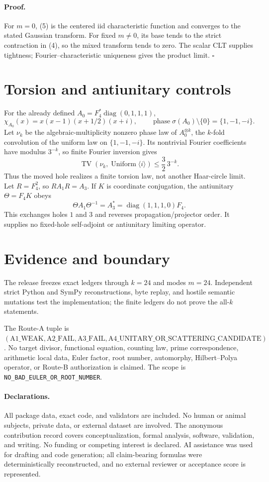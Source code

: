 \documentclass[10pt]{article}
\begin{document}
\paragraph{Proof.}
For $m=0$, (5) is the centered iid characteristic function and converges to
the stated Gaussian transform.  For fixed $m\ne0$, its base tends to the
strict contraction in (4), so the mixed transform tends to zero.  The scalar
CLT supplies tightness; Fourier--characteristic uniqueness gives the product
limit. \hfill$\square$

\section{Torsion and antiunitary controls}
For the already defined $A_0=F_4^*\operatorname{diag}(0,1,1,1)$,
\[
 \chi_{A_0}(x)=x(x-1)(x+1/2)(x+i),\qquad
 \operatorname{phase}\sigma(A_0)\setminus\{0\}=\{1,-1,-i\}.  \tag{6}
\]
Let $\nu_k$ be the algebraic-multiplicity nonzero phase law of
$A_0^{\otimes k}$, the $k$-fold convolution of the uniform law on
$\{1,-1,-i\}$.  Its nontrivial Fourier coefficients have modulus $3^{-k}$,
so finite Fourier inversion gives
\[
 \operatorname{TV}(\nu_k,\operatorname{Uniform}\langle i\rangle)
 \leq\frac32\,3^{-k}.                                           \tag{7}
\]
Thus the moved hole realizes a finite torsion law, not another Haar-circle
limit.  Let $R=F_4^2$, so $RA_1R=A_3$.  If $K$ is coordinate conjugation,
the antiunitary $\Theta=F_4K$ obeys
\[
 \Theta A_1\Theta^{-1}=A_3^*=\operatorname{diag}(1,1,1,0)F_4.  \tag{8}
\]
This exchanges holes $1$ and $3$ and reverses propagation/projector order.
It supplies no fixed-hole self-adjoint or antiunitary limiting operator.

\section{Evidence and boundary}
The release freezes exact ledgers through $k=24$ and modes $m=24$.
Independent strict Python and SymPy reconstructions, byte replay, and hostile
semantic mutations test the implementation; the finite ledgers do not prove
the all-$k$ statements.

The Route-A tuple is
$(\mathrm{A1\_WEAK},\mathrm{A2\_FAIL},\mathrm{A3\_FAIL},
\mathrm{A4\_UNITARY\_OR\_SCATTERING\_CANDIDATE})$.
No target divisor, functional equation, counting law, prime correspondence,
arithmetic local data, Euler factor, root number, automorphy,
Hilbert--Polya operator, or Route-B authorization is claimed.  The scope is
\texttt{NO\_BAD\_EULER\_OR\_ROOT\_NUMBER}.

\paragraph{Declarations.}
All package data, exact code, and validators are included.  No human or
animal subjects, private data, or external dataset are involved.  The
anonymous contribution record covers conceptualization, formal analysis,
software, validation, and writing.  No funding or competing interest is
declared.  AI assistance was used for drafting and code generation; all
claim-bearing formulas were deterministically reconstructed, and no external
reviewer or acceptance score is represented.
\end{document}
